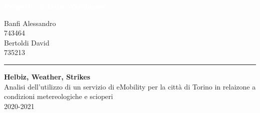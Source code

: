 \documentclass[12pt, a4paper, oneside]{report}
\author{%
    Banfi Alessandro \\
    743464 \\
    -\\
    Bertoldi David \\
    735213 \\
    -\\
    }
\begin{document}
\begin{titlepage}
\BgThispage
{}
\vspace*{0.4\textheight}
\noindent
\textcolor{white}{\Huge\textbf{\textsf{Progetto di Data Warehouse}}}
\vspace*{2cm}\par
\noindent
\begin{minipage}{0.35\linewidth}
    \begin{flushright}
        {%
    Banfi Alessandro \\
    743464 \\[2\baselineskip]
    
    Bertoldi David \\
    735213 
    
    }
    \end{flushright}
\end{minipage} \hspace{35pt}
%
\begin{minipage}{0.02\linewidth}
    \rule{1pt}{175pt}
\end{minipage} \hspace{10pt}
%
\begin{minipage}{0.63\linewidth}
\vspace{5pt}
    {\Huge\textbf{Helbiz, Weather, Strikes\\[10pt]}}
   	Analisi dell'utilizzo di un servizio di eMobility per la città di Torino
	in relaizone a condizioni metereologiche e scioperi
    \\ 2020-2021
\end{minipage}
\end{titlepage}
\restoregeometry


\newpage\tableofcontents\newpage







\end{document}
